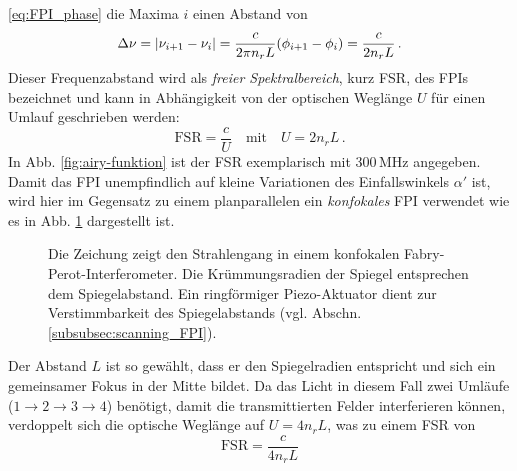 \eqref{eq:FPI_phase} die Maxima $i$ einen Abstand von
\begin{equation}\label{eq:FPI_transmissionsmaxima}
	\Delta\nu=\left|\nu_{i+1}-\nu_i\right|=\frac{c}{2\pi	n_rL}(\phi_{i+1}-\phi_i)=\frac{c}{2n_rL}\,.
\end{equation}
Dieser Frequenzabstand wird als \textit{freier Spektralbereich}, kurz FSR, des
FPIs bezeichnet und kann in Abhängigkeit von der optischen Weglänge $U$ für
einen Umlauf geschrieben werden:
\begin{equation}\label{eq:FPI_FSR_01}
	\text{FSR}=\frac{c}{U}
	\quad\text{mit}\quad
	U=2n_rL\,.
\end{equation}
In Abb. \ref{fig:airy-funktion} ist der FSR exemplarisch mit $300\,$MHz
angegeben. Damit das FPI unempfindlich auf kleine Variationen des Einfallswinkels $\alpha'$
ist, wird hier im Gegensatz zu einem planparallelen ein \textit{konfokales} FPI
verwendet wie es in Abb. \ref{fig:FPI_konfokal} dargestellt ist.
\begin{figure}[h]
 	\centering
	\caption[FPI - konfokal]{Die Zeichung zeigt den Strahlengang in einem
	konfokalen Fabry-Perot-Interferometer. Die
	Krümmungsradien der Spiegel entsprechen dem
	Spiegelabstand. Ein ringförmiger Piezo-Aktuator dient zur
	Verstimmbarkeit des Spiegelabstands (vgl. Abschn.
	\ref{subsubsec:scanning_FPI}).}\label{fig:FPI_konfokal}
\end{figure}
Der Abstand $L$ ist so gewählt, dass er den Spiegelradien entspricht und sich
ein gemeinsamer Fokus in der Mitte bildet. Da das Licht
in diesem Fall zwei Umläufe ($1\rightarrow2\rightarrow3\rightarrow4$)
benötigt, damit die transmittierten Felder interferieren können,
verdoppelt sich die optische Weglänge auf $U=4n_rL$, was zu einem FSR von
\begin{equation}\label{eq:FPI_FSR_02}
	\text{FSR}=\frac{c}{4n_rL}
\end{equation}
